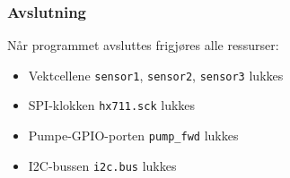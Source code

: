 \subsubsection{Avslutning}
Når programmet avsluttes frigjøres alle ressurser:
\begin{itemize}
    \item Vektcellene \texttt{sensor1}, \texttt{sensor2}, \texttt{sensor3} lukkes
    \item SPI-klokken \texttt{hx711.sck} lukkes
    \item Pumpe-GPIO-porten \texttt{pump\_fwd} lukkes
    \item I2C-bussen \texttt{i2c.bus} lukkes
\end{itemize}